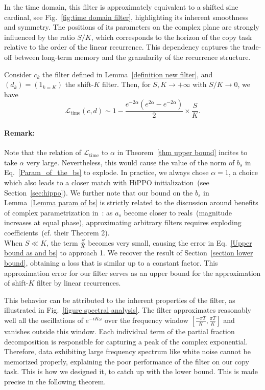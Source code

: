 In the time domain, this filter is approximately equivalent to a shifted sine cardinal, see Fig.~\ref{fig:time domain filter}, highlighting its inherent smoothness and symmetry. The positions of its parameters on the complex plane are strongly influenced by the ratio $S/K$, which corresponds to the horizon of the copy task relative to the order of the linear recurrence. This dependency captures the trade-off between long-term memory and the granularity of the recurrence structure.




\begin{theorem}\label{thm upper bound}
    Consider $c_k$ the filter defined in Lemma~\ref{definition new filter}, and $(d_k) = (1_{k=K})$ the shift-$K$ filter. Then, for $S,K \to +\infty$ with $S/K \to 0$, we have 
    \begin{equation}
        \mathcal{L}_\text{time}(c, d) \sim 1 - \frac{e^{-2\alpha}(e^{2\alpha} - e^{-2\alpha})}{2} \times \frac{S}{K}.
        \label{Upper bound as and bs}
    \end{equation}
\end{theorem}
\paragraph{Remark:} Note that the relation of $\mathcal{L}_\text{time}$ to $\alpha$ in Theorem~\ref{thm upper bound} incites to take $\alpha$ very large. Nevertheless, this would cause the value of the norm of $b_s$ in Eq.~\eqref{Param_of_the_bs} to explode. In practice, we always chose $\alpha =1$, a choice which also leads to a closer match with HiPPO initialization~(see Section~\ref{sec:hippo}). We further note that our bound on the $b_s$ in Lemma~\ref{Lemma param of bs} is strictly related to the discussion around benefits of complex parametrization in~\citet{ran2024provable}: as $a_s$ become closer to reals~(magnitude increases at equal phase), approximating arbitrary filters requires exploding coefficients~(cf. their Theorem 2). \ \\

When $S \ll K$, the term $\frac{S}{K}$ becomes very small, causing the error in Eq.~\eqref{Upper bound as and bs} to approach 1. We recover the result of Section~\ref{section lower bound}, obtaining a loss that is similar up to a constant factor. This approximation error for our filter serves as an upper bound for the approximation of shift-$K$ filter by linear recurrences.

This behavior can be attributed to the inherent properties of the filter, as illustrated in Fig.~\ref{figure spectral analysis}. The filter approximates reasonably well all the oscillations of $e^{-iK\omega}$ over the frequency window $[\frac{-\pi T}{K}, \frac{\pi T}{K}]$ and vanishes outside this window. Each individual term of the partial fraction decomposition is responsible for capturing a peak of the complex exponential. Therefore, data exhibiting large frequency spectrum like white noise cannot be memorized properly, explaining the poor performance of the filter on our copy task. This is how we designed it, to catch up with the lower bound. This is made precise in the following theorem.

